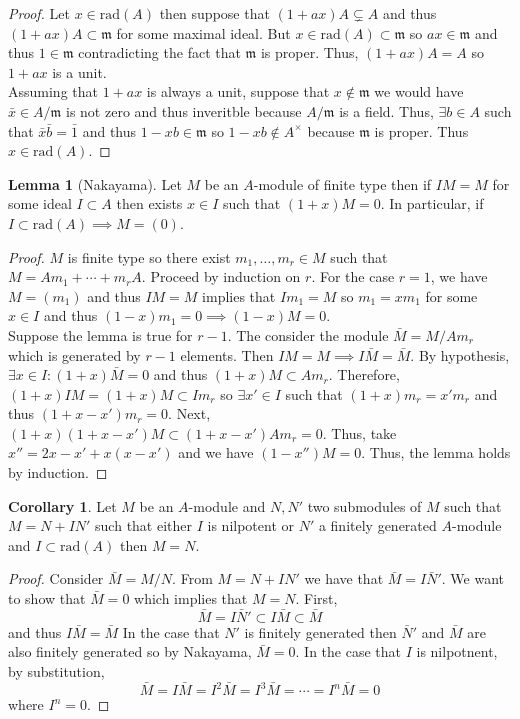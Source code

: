 \documentclass[12pt]{article}
\newcommand{\rad}[1]{\mathrm{rad}\left( #1 \right)}
\newcommand{\m}{\mathfrak{m}}
\theoremstyle{remark}
\theoremstyle{definition}
\newtheorem{lemma}[theorem]{Lemma}
\newtheorem{corollary}[theorem]{Corollary}
\begin{document}
\begin{proof}
Let $x \in \rad{A}$ then suppose that $(1 + ax) A \subsetneq A$ and thus $(1 + ax)A \subset \m$ for some maximal ideal. But $x \in \rad{A} \subset \m$ so $ax \in \m$ and thus $1 \in \m$ contradicting the fact that $\m$ is proper. Thus, $( 1 + a x) A = A$ so $1 + ax$ is a unit. 
\bigskip\\
Assuming that $1 + a x$ is always a unit, suppose that $x \notin \m$ we would have $\bar{x} \in A / \m$ is not zero and thus inveritble because $A / \m$ is a field. Thus, $\exists b \in A $ such that $\bar{x}\bar{b} = \bar{1}$ and thus $1 - xb \in \m$ so $1 - x b \notin A^\times$ because $\m$ is proper. Thus $x \in \rad{A}$. 
\end{proof}


\begin{lemma}[Nakayama]
Let $M$ be an $A$-module of finite type then if $I M = M$ for some ideal $I \subset A$ then exists $x \in I$ such that $(1 + x) M = 0$. In particular, if $I \subset \rad{A} \implies M = (0)$. 
\end{lemma}


\begin{proof}
$M$ is finite type so there exist $m_1, \dots, m_r \in M$ such that $M = A m_1 + \cdots + m_r A$. Proceed by induction on $r$. For the case $r = 1$, we have $M = (m_1)$ and thus $IM = M$ implies that $I m_1 = M$ so $m_1 = x m_1$ for some $x \in I$ and thus $(1 - x) m_1 = 0 \implies (1 - x) M = 0$. 
\bigskip\\
Suppose the lemma is true for $r-1$. The consider the module $\bar{M} = M / A m_r$ which is generated by $r-1$ elements. Then $IM = M \implies I \bar{M} = \bar{M}$. By hypothesis, $\exists x \in I : (1 + x) \bar{M} = 0$ and thus $(1 + x) M \subset A m_r$. Therefore, $(1 + x) IM = (1 + x) M \subset I m_r$ so $\exists x' \in I$ such that $(1 + x) m_r = x' m_r$ and thus $(1 + x - x') m_r = 0$.
Next, $(1 + x)(1 + x - x') M \subset (1 + x - x') A m_r = 0$. Thus, take $x'' = 2x - x' + x(x - x')$ and we have $(1 - x'') M = 0$. Thus, the lemma holds by induction. 
\end{proof}

\begin{corollary}
Let $M$ be an $A$-module and $N,N'$ two submodules of $M$ such that $M = N + I N'$ such that either $I$ is nilpotent or $N'$ a finitely generated $A$-module and $I \subset \rad{A}$ then $M = N$. 
\end{corollary}

\begin{proof}
Consider $\bar{M} = M / N$. From $M = N + I N'$ we have that $\bar{M} = I \bar{N}'$. We want to show that $\bar{M} = 0$ which implies that $M = N$. First,
\[ \bar{M} = I \bar{N}' \subset I \bar{M} \subset \bar{M} \]
and thus $I \bar{M} = \bar{M}$
In the case that $N'$ is finitely generated then $\bar{N}'$ and $\bar{M}$ are also finitely generated so by Nakayama, $\bar{M} = 0$. In the case that $I$ is nilpotnent, by substitution,
\[ \bar{M} = I \bar{M} = I^2 \bar{M} = I^3 \bar{M} = \cdots = I^n \bar{M} = 0 \]   
where $I^n = 0$.
\end{proof}
\end{document}
